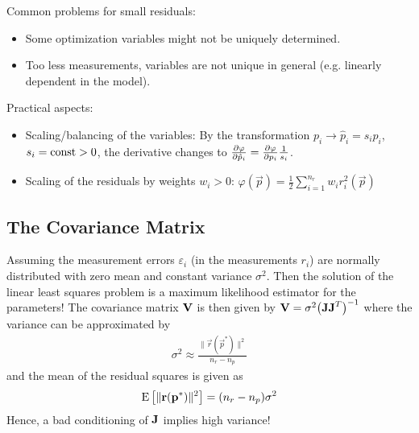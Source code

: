 			Common problems for small residuals:
			\begin{itemize}
				\item Some optimization variables might not be uniquely determined.
				\item Too less measurements, variables are not unique in general (e.g. linearly dependent in the model).
			\end{itemize}
		
			Practical aspects:
			\begin{itemize}
				\item Scaling/balancing of the variables: By the transformation \( p_i \to \hat{p}_i = s_i p_i \), \( s_i = \operatorname{const} > 0 \), the derivative changes to \( \pdv{\varphi}{\hat{p}_i} = \pdv{\varphi}{p_i} \frac{1}{s_i} \).
				\item Scaling of the residuals by weights \( w_i > 0 \): \( \varphi(\vec{p}) = \frac{1}{2} \sum_{i = 1}^{n_r} w_i r_i^2(\vec{p}) \)
			\end{itemize}
		
		\subsection{The Covariance Matrix}
			Assuming the measurement errors \( \varepsilon_i \) (in the measurements \(r_i\)) are normally distributed with zero mean and constant variance \(\sigma^2\). Then the solution of the linear least squares problem is a maximum likelihood estimator for the parameters! The covariance matrix \(\boldsymbol{\mathrm{V}}\) is then given by \( \boldsymbol{\mathrm{V}} = \sigma^2 \big(\boldsymbol{\mathrm{J}} \boldsymbol{\mathrm{J}}^T\big)^{-1} \) where the variance can be approximated by
			\begin{align*}
				\sigma^2 \approx \frac{\lVert \vec{r}(\vec{p}^\ast) \rVert^2}{n_r - n_p}
			\end{align*}
			and the mean of the residual squares is given as
			\begin{align*}
				\operatorname{E}\big[ \lVert \boldsymbol{\mathrm{r}}(\boldsymbol{\mathrm{p}}^\ast) \rVert^2 \big] = (n_r - n_p) \sigma^2
			\end{align*}
			Hence, a bad conditioning of \(\boldsymbol{\mathrm{J}}\) implies high variance!

